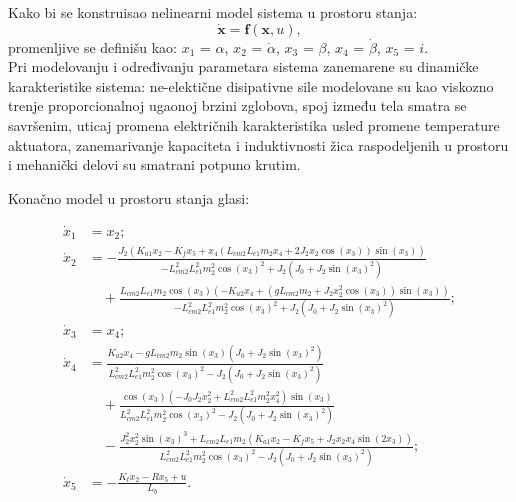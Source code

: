 \documentclass[a4paper,11pt]{article}
\theoremstyle{definition} \newtheorem{deff}{Definicija}[section]
\theoremstyle{definition} \newtheorem{prim}[deff]{Primer}
\theoremstyle{plain} \newtheorem{teor}[deff]{Teorema}
\newcommand{\vect}[1]{\boldsymbol{\mathbf{#1}}}
\begin{document}
	Kako bi se konstruisao nelinearni model sistema u prostoru stanja: 
	\begin{equation}
		\dot{ \vect{x}} = \vect{f}(\vect{x}, u),
	\end{equation}
	promenljive se definišu kao: $x_1$ = $\alpha$, $x_2$ = $\dot\alpha$,  $x_3$ = $\beta$, $x_4$ = $\dot\beta$, $x_5$ = $i$. \\
	
	
	Pri modelovanju i određivanju parametara sistema
	zanemarene su dinamičke karakteristike sistema: ne-elektične disipativne sile modelovane su kao viskozno trenje proporcionalnoj ugaonoj brzini zglobova, spoj između tela smatra se savršenim, uticaj promena električnih karakteristika usled promene temperature aktuatora, zanemarivanje kapaciteta i induktivnosti žica raspodeljenih u prostoru i mehanički delovi su smatrani potpuno krutim.\\
	
	
	\newpage
	
	Konačno model u prostoru stanja glasi:
	
	\begin{equation}
		\begin{aligned}
			\dot{x}_1 &= x_2; \\[0.8em]
			\dot{x}_2 &= -\frac{J_2(K_{a1}x_2 - K_fx_5 + x_4(L_{cm2}L_{e1}m_2x_4 + 2J_2x_2\cos(x_3))\sin(x_3))}{-L_{cm2}^2L_{e1}^2m_2^2\cos(x_3)^2 + J_2(J_0 + J_2\sin(x_3)^2)} \\[0.8em]
			&\quad + \frac{L_{cm2}L_{e1}m_2\cos(x_3)(-K_{a2}x_4 + (gL_{cm2}m_2 + J_2x_2^2\cos(x_3))\sin(x_3))}{-L_{cm2}^2L_{e1}^2m_2^2\cos(x_3)^2 + J_2(J_0 + J_2\sin(x_3)^2)}; \\[0.8em]
			\dot{x}_3 &= x_4; \\[0.5em]
			\dot{x}_4 &= \frac{K_{a2}x_4 - gL_{cm2}m_2\sin(x_3)(J_0 + J_2\sin(x_3)^2)}{L_{cm2}^2L_{e1}^2m_2^2\cos(x_3)^2 - J_2(J_0 + J_2\sin(x_3)^2)} \\[0.8em]
			&\quad + \frac{\cos(x_3)(-J_0J_2x_2^2 + L_{cm2}^2L_{e1}^2m_2^2x_4^2)\sin(x_3)}{L_{cm2}^2L_{e1}^2m_2^2\cos(x_3)^2 - J_2(J_0 + J_2\sin(x_3)^2)} \\[0.8em]
			&\quad - \frac{J_2^2x_2^2\sin(x_3)^3 + L_{cm2}L_{e1}m_2(K_{a1}x_2 - K_fx_5 + J_2x_2x_4\sin(2x_3))}{L_{cm2}^2L_{e1}^2m_2^2\cos(x_3)^2 - J_2(J_0 + J_2\sin(x_3)^2)};\\[0.5em]
			\dot{x}_5 &= -\frac{K_tx_2 - Rx_5 + u}{L_b}.
		\end{aligned}
		\label{eq:nonModel}
	\end{equation}\\
	
\end{document}
